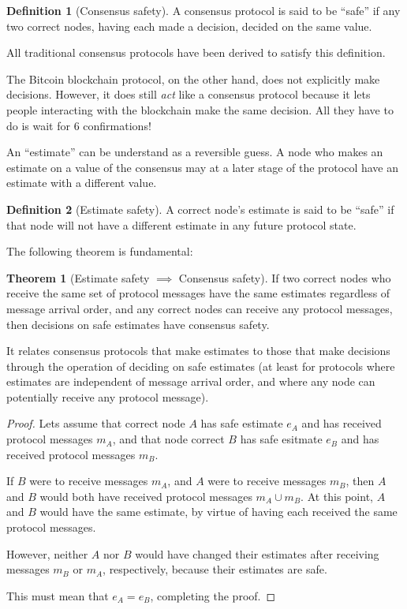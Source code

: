 \documentclass{article}
\theoremstyle{definition}
\newtheorem{thm}{Theorem}
\newtheorem{defn}{Definition}[section]
\begin{document}
\begin{defn}[Consensus safety]
A consensus protocol is said to be ``safe” if any two correct nodes, having each made a decision, decided on the same value.
\end{defn}

All traditional consensus protocols have been derived to satisfy this definition.

The Bitcoin blockchain protocol, on the other hand, does not explicitly make decisions. However, it does still \emph{act} like a consensus protocol because it lets people interacting with the blockchain make the same decision. All they have to do is wait for 6 confirmations!

An ``estimate'' can be understand as a reversible guess. A node who makes an estimate on a value of the consensus may at a later stage of the protocol have an estimate with a different value.

\begin{defn}[Estimate safety]
A correct node's estimate is said to be ``safe'' if that node will not have a different estimate in any future protocol state.
\end{defn}

The following theorem is fundamental:

\begin{thm}[Estimate safety $\implies$ Consensus safety]
If two correct nodes who receive the same set of protocol messages have the same estimates regardless of message arrival order, and any correct nodes can receive any protocol messages, then decisions on safe estimates have consensus safety.
\end{thm}

It relates consensus protocols that make estimates to those that make decisions through the operation of deciding on safe estimates (at least for protocols where estimates are independent of message arrival order, and where any node can potentially receive any protocol message).

\begin{proof}
Lets assume that correct node $A$ has safe estimate $e_A$ and has received protocol messages $m_A$, and that node correct $B$ has safe esitmate $e_B$ and has received protocol messages $m_B$.

If $B$ were to receive messages $m_A$, and $A$ were to receive messages $m_B$, then $A$ and $B$ would both have received protocol messages $m_A \cup m_B$. At this point, $A$ and $B$ would have the same estimate, by virtue of having each received the same protocol messages.

However, neither $A$ nor $B$ would have changed their estimates after receiving messages $m_B$ or $m_A$, respectively, because their estimates are safe.

This must mean that $e_A = e_B$, completing the proof.

\end{proof}
\end{document}
